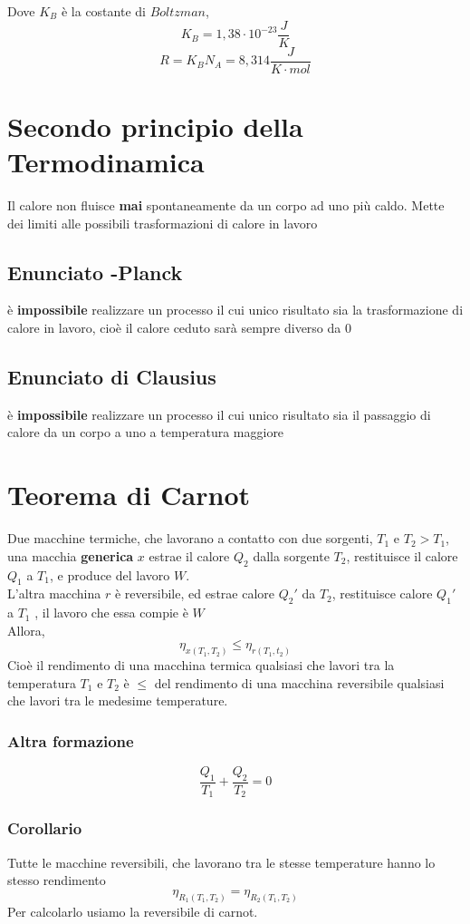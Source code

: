 \documentclass[a4paper]{report}
\begin{document}
  Dove $K_B$ è la costante di $Boltzman$,
  $$ K_B = 1,38 \cdot 10^{-23} \frac{J}{K}$$
  $$ R = K_B N_A = 8,314 \frac{J}{K \cdot mol} $$

  \section{Secondo principio della Termodinamica}
  Il calore non fluisce \textbf{mai} spontaneamente da un corpo ad uno più caldo.
  Mette dei limiti alle possibili trasformazioni di calore in lavoro
  \subsection{Enunciato -Planck}
  è \textbf{impossibile} realizzare un processo il cui unico risultato sia la trasformazione di calore in lavoro, cioè il calore ceduto sarà sempre diverso da 0
  \subsection{Enunciato di Clausius}
  è \textbf{impossibile} realizzare un processo il cui unico risultato sia il passaggio di calore da un corpo a uno a temperatura maggiore

  \section{Teorema di Carnot}
  Due macchine termiche, che lavorano a contatto con due sorgenti, $T_1$ e $T_2 > T_1$, una macchia \textbf{generica} $x$ estrae il calore $Q_2$ dalla sorgente $T_2$, restituisce il calore $Q_1$ a $T_1$, e produce del lavoro $W$. \\
  L'altra macchina $r$ è reversibile, ed estrae calore $Q_2'$ da $T_2$, restituisce calore $Q_1'$ a $T_1$ , il lavoro che essa compie è $W$\\
  Allora,
  $$ \eta_{x(T_1, T_2)}  \leq \eta_{r(T_1, t_2)} $$
  Cioè il rendimento di una macchina termica qualsiasi che lavori tra la temperatura $T_1$ e $T_2$ è $\leq$ del rendimento di una macchina reversibile qualsiasi che lavori tra le medesime temperature.\\
  \subsubsection{Altra formazione}
  $$ \frac{Q_1}{T_1} + \frac{Q_2}{T_2} = 0 $$

  \subsubsection{Corollario}
  Tutte le macchine reversibili, che lavorano tra le stesse temperature hanno lo stesso rendimento
  $$ \eta_{R_1(T_1, T_2)} = \eta_{R_2(T_1, T_2)} $$
  Per calcolarlo usiamo la reversibile di carnot.
\end{document}

